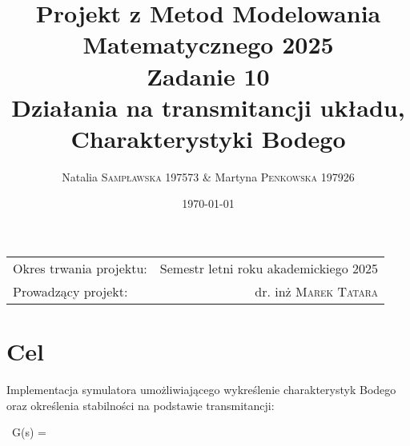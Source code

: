 \documentclass[
	letterpaper, %
	10pt, %
]{CSUniSchoolLabReport}
\title{Projekt z Metod Modelowania Matematycznego 2025 \\ Zadanie 10 \\ Działania na transmitancji układu, Charakterystyki Bodego} %
\author{Natalia \textsc{Sampławska 197573} \& Martyna \textsc{Penkowska 197926}} %
\date{\today} %
\begin{document}
\maketitle %

\begin{center}
	\begin{tabular}{l r}
		Okres trwania projektu: & Semestr letni roku akademickiego 2025 \\ %
		Prowadzący projekt: & dr. inż \textsc{Marek Tatara} %
	\end{tabular}
\end{center}



\section{Cel}

Implementacja symulatora umożliwiającego wykreślenie charakterystyk Bodego oraz określenia stabilności na podstawie transmitancji:

\begin{center}
	\ {G(s) = } %
\end{center}


\end{document}
